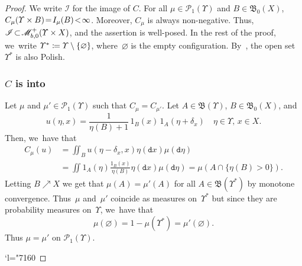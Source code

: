 \documentclass[JEP,XML,SOM,Unicode,published]{cedram}
\newcommand{\Changel}{\mathcode`l="7160}
\theoremstyle{definition}
\theoremstyle{remark}
\DeclarePairedDelimiter{\set}{\lbrace}{\rbrace}
\begin{document}
\begin{proof}
We write $\mathscr{I}$ for the image of $C$.
For all $\mu \in \mathscr{P}_{1}(\varUpsilon)$ and $B \in \mathfrak{B}_{0}(X)$, $C_{\mu}(\varUpsilon \times\nobreak B) \!=\! I_{\mu}(B) \!<\! \infty$.
Moreover, $C_{\mu}$ is always non-negative.
Thus, $\mathscr{I} \!\subset\! \mathscr{M}^{+}_{b,0}(\varUpsilon \times\nobreak X)$, and the assertion is well-posed.
In the rest of the proof, we~write $\varUpsilon^{*} \coloneq \varUpsilon \setminus \set{\varnothing}$, where~$\varnothing$ is the empty configuration.
By~\cite[IX, p.\,57, Prop.\,1]{BourbakiTopo2}, the open set $\varUpsilon^{*}$ is also Polish.
\subsubsection*{$C$ is into}
Let $\mu$ and $\mu' \in \mathscr{P}_{1}(\varUpsilon)$ such that $C_{\mu} = C_{\mu'}$.
Let $A \in \mathfrak{B}(\varUpsilon)$, $B \in \mathfrak{B}_{0}(X)$, and
\begin{equation*}
u(\eta, x) = \frac{1}{\eta(B) + 1}\, 1_{B}(x)\, 1_{A}(\eta + \delta_{x}) \quad \eta \in \varUpsilon,\, x \in X.
\end{equation*}
Then, we~have that
\begin{align*}
C_{\mu}(u) &= \iint_{B} u(\eta - \delta_{x}, x) \eta(\mathtt{d} x) \mu(\mathtt{d} \eta)\\
&= \iint 1_{A}(\eta) \frac{1_{B}(x)}{\eta(B)} \eta(\mathtt{d} x) \mu(\mathtt{d} \eta) = \mu(A \cap \{\eta(B) > 0 \}).
\end{align*}
Letting $B \nearrow X$ we get that $\mu(A) = \mu'(A)$ for all $A \in \mathfrak{B}(\varUpsilon^{*})$ by monotone convergence.
Thus~$\mu$ and~$\mu'$ coincide as measures on~$\varUpsilon^{*}$ but since they are probability measures on~$\varUpsilon$, we~have that
\begin{equation*}
\mu(\varnothing) = 1 -\mu(\varUpsilon^{*}) = \mu'(\varnothing).
\end{equation*}
Thus $\mu = \mu'$ on $\mathscr{P}_{1}(\varUpsilon)$.

\Changel

\end{proof}
\end{document}
